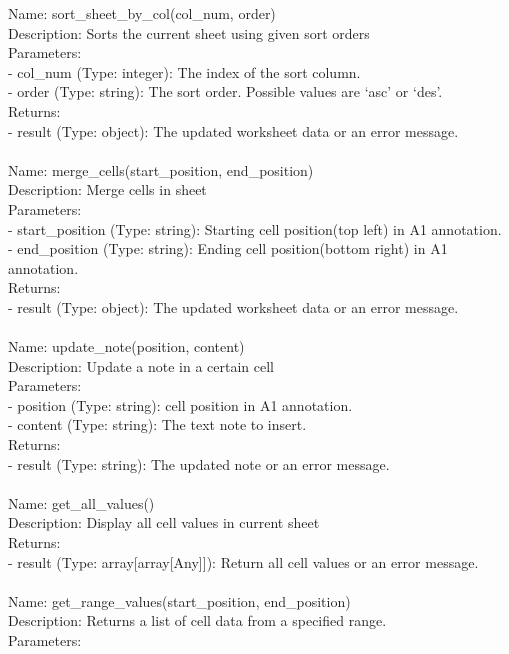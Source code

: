 \begin{tcolorbox}[breakable,title=Prompt Details for Sheet]
Name: sort\_sheet\_by\_col(col\_num, order)\\
Description: Sorts the current sheet using given sort orders\\
Parameters:\\
- col\_num (Type: integer): The index of the sort column.\\
- order (Type: string): The sort order. Possible values are `asc' or `des'.\\
Returns:\\
- result (Type: object): The updated worksheet data or an error message.\\
\\
Name: merge\_cells(start\_position, end\_position)\\
Description: Merge cells in sheet\\
Parameters:\\
- start\_position (Type: string): Starting cell position(top left) in A1 annotation.\\
- end\_position (Type: string): Ending cell position(bottom right) in A1 annotation.\\
Returns:\\
- result (Type: object): The updated worksheet data or an error message.\\
\\
Name: update\_note(position, content)\\
Description: Update a note in a certain cell\\
Parameters:\\
- position (Type: string): cell position in A1 annotation.\\
- content (Type: string): The text note to insert.\\
Returns:\\
- result (Type: string): The updated note or an error message.\\
\\
Name: get\_all\_values()\\
Description: Display all cell values in current sheet\\
Returns:\\
- result (Type: array[array[Any]]): Return all cell values or an error message.\\
\\
Name: get\_range\_values(start\_position, end\_position)\\
Description: Returns a list of cell data from a specified range.\\
Parameters:\\

\end{tcolorbox}
